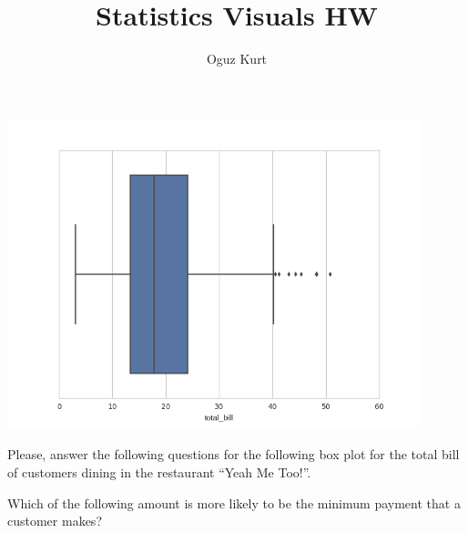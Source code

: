 \documentclass{ximera}
\title{Statistics Visuals HW}
\author{Oguz Kurt}
\begin{document}
\begin{abstract}
\empty
\end{abstract}
\maketitle
\begin{center}
\includegraphics[width=12cm]{../hbplot.png}
\end{center}

\begin{problem} 
Please, answer the following questions for the following box plot for the total bill of customers dining in the restaurant ``Yeah Me Too!''. 

Which of the following amount is more likely to be the minimum payment that a customer makes?
    \begin{multipleChoice}
    \end{multipleChoice}


\end{problem}
\end{document}
